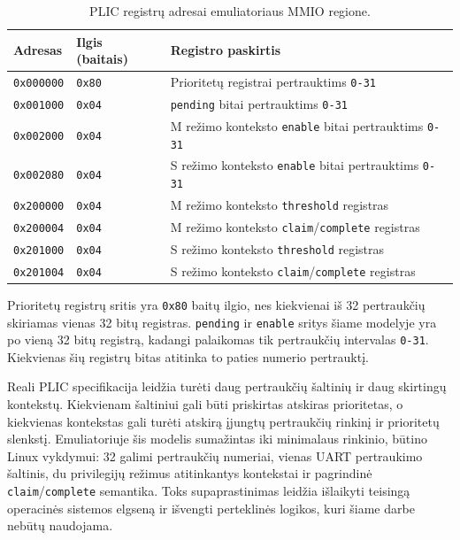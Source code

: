 \begin{table}[h]
    \centering
    \begin{tabular}{|l|l|l|}
        \hline
        \textbf{Adresas} & \textbf{Ilgis (baitais)} & \textbf{Registro paskirtis} \\
        \hline
        \texttt{0x000000} & \texttt{0x80} & Prioritetų registrai pertrauktims \texttt{0-31} \\
        \hline
        \texttt{0x001000} & \texttt{0x04} & \texttt{pending} bitai pertrauktims \texttt{0-31} \\
        \hline
        \texttt{0x002000} & \texttt{0x04} & M režimo konteksto \texttt{enable} bitai pertrauktims \texttt{0-31} \\
        \hline
        \texttt{0x002080} & \texttt{0x04} & S režimo konteksto \texttt{enable} bitai pertrauktims \texttt{0-31} \\
        \hline
        \texttt{0x200000} & \texttt{0x04} & M režimo konteksto \texttt{threshold} registras \\
        \hline
        \texttt{0x200004} & \texttt{0x04} & M režimo konteksto \texttt{claim}/\texttt{complete} registras \\
        \hline
        \texttt{0x201000} & \texttt{0x04} & S režimo konteksto \texttt{threshold} registras \\
        \hline
        \texttt{0x201004} & \texttt{0x04} & S režimo konteksto \texttt{claim}/\texttt{complete} registras \\
        \hline
    \end{tabular}
    \caption{PLIC registrų adresai emuliatoriaus MMIO regione.}
    \label{table:plic_registers}
\end{table}

Prioritetų registrų sritis yra \texttt{0x80} baitų ilgio, nes kiekvienai iš 32 pertraukčių skiriamas vienas 32 bitų registras. \texttt{pending} ir \texttt{enable} sritys šiame modelyje yra po vieną 32 bitų registrą, kadangi palaikomas tik pertraukčių intervalas \texttt{0-31}. Kiekvienas šių registrų bitas atitinka to paties numerio pertrauktį.

Reali PLIC specifikacija leidžia turėti daug pertraukčių šaltinių ir daug skirtingų kontekstų. Kiekvienam šaltiniui gali būti priskirtas atskiras prioritetas, o kiekvienas kontekstas gali turėti atskirą įjungtų pertraukčių rinkinį ir prioritetų slenkstį. Emuliatoriuje šis modelis sumažintas iki minimalaus rinkinio, būtino Linux vykdymui: 32 galimi pertraukčių numeriai, vienas UART pertraukimo šaltinis, du privilegijų režimus atitinkantys kontekstai ir pagrindinė \texttt{claim}/\texttt{complete} semantika. Toks supaprastinimas leidžia išlaikyti teisingą operacinės sistemos elgseną ir išvengti perteklinės logikos, kuri šiame darbe nebūtų naudojama.

